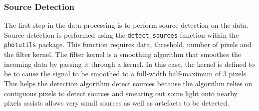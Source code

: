 \documentclass[a4paper,fleqn,usenatbib]{mnras}
\begin{document}
\subsubsection{Source Detection}
The first step in the data processing is to perform source detection on the data. Source detection is performed using the  \texttt{detect\_sources} function within the \texttt{photutils} package. This function requires data, threshold, number of pixels and the filter kernel. The filter kernel is a smoothing algorithm that smoothes the incoming data by passing it through a kernel. In this case, the kernel is defined to be to cause the signal to be smoothed to a full-width half-maximum of 3 pixels. This helps the detection algorithm detect sources because the algorithm relies on contiguous pixels to detect sources and smearing out some light onto nearby pixels assists allows very small sources as well as artefacts to be detected.
\end{document}
